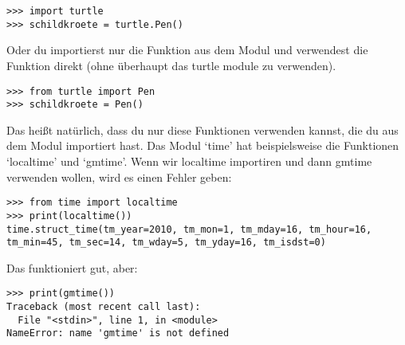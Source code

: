\begin{Verbatim}[frame=single]
>>> import turtle
>>> schildkroete = turtle.Pen()
\end{Verbatim}

Oder du importierst nur die  Funktion aus dem Modul und verwendest die Funktion direkt (ohne überhaupt das turtle module zu verwenden).

\begin{Verbatim}[frame=single]
>>> from turtle import Pen
>>> schildkroete = Pen()
\end{Verbatim}

Das heißt natürlich, dass du nur diese Funktionen verwenden kannst, die du aus dem Modul importiert hast. Das Modul `time' hat beispielsweise die Funktionen `localtime' und `gmtime'. Wenn wir localtime importiren und dann gmtime verwenden wollen, wird es einen Fehler geben: 

\begin{Verbatim}[frame=single]
>>> from time import localtime
>>> print(localtime())
time.struct_time(tm_year=2010, tm_mon=1, tm_mday=16, tm_hour=16, 
tm_min=45, tm_sec=14, tm_wday=5, tm_yday=16, tm_isdst=0)
\end{Verbatim}

\noindent
Das funktioniert gut, aber:

\begin{Verbatim}[frame=single]
>>> print(gmtime())
Traceback (most recent call last):
  File "<stdin>", line 1, in <module>
NameError: name 'gmtime' is not defined
\end{Verbatim}

